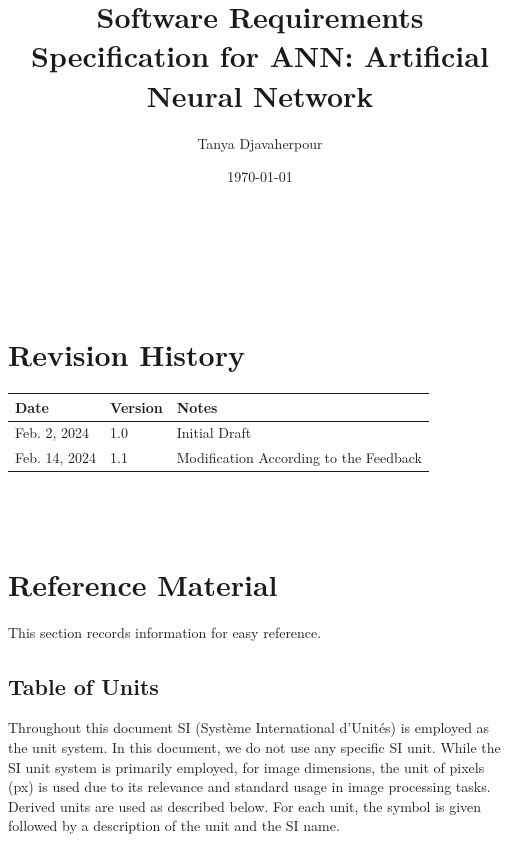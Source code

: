 \documentclass[12pt]{article}
\begin{document}
\title{Software Requirements Specification for ANN: Artificial Neural Network} 
\author{Tanya Djavaherpour}
\date{\today}
	
\maketitle

~\newpage


\tableofcontents

~\newpage

\section*{Revision History}

\begin{tabularx}{\textwidth}{p{3cm}p{2cm}X}
\toprule {\bf Date} & {\bf Version} & {\bf Notes}\\
\midrule
Feb. 2, 2024 & 1.0 & Initial Draft\\
Feb. 14, 2024 & 1.1 & Modification According to the Feedback\\
\bottomrule
\end{tabularx}

~\\

~\newpage

\section{Reference Material}

This section records information for easy reference.

\subsection{Table of Units}

Throughout this document SI (Syst\`{e}me International d'Unit\'{e}s) is employed
as the unit system. 
In this document, we do not use any specific SI unit.
While the SI unit system is primarily employed, for image dimensions, the unit 
of pixels (px) is used due to its relevance and standard usage in image processing tasks.
Derived units are used as described below. For each unit, the symbol is given followed by a
description of the unit and the SI name.
\end{document}

